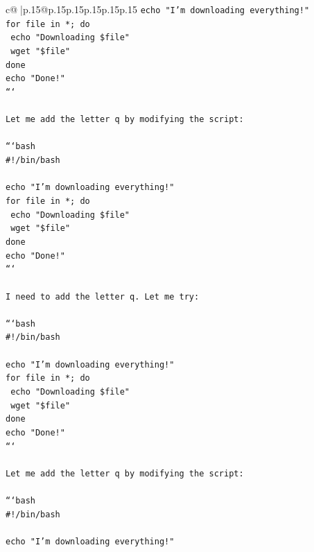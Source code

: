 \documentclass{article}
\begin{document}
{\begin{supertabular}{c@{$\;$}|p{.15\linewidth}@{}p{.15\linewidth}p{.15\linewidth}p{.15\linewidth}p{.15\linewidth}p{.15\linewidth}}
{{{\texttt{echo "I'm downloading everything!"} \\
\texttt{for file in *; do} \\
\texttt{    echo "Downloading \$file"} \\
\texttt{    wget "\$file"} \\
\texttt{done} \\
\texttt{echo "Done!"} \\
\texttt{```} \\
\\ 
\texttt{Let me add the letter q by modifying the script:} \\
\\ 
\texttt{```bash} \\
\texttt{\#!/bin/bash} \\
\\ 
\texttt{echo "I'm downloading everything!"} \\
\texttt{for file in *; do} \\
\texttt{    echo "Downloading \$file"} \\
\texttt{    wget "\$file"} \\
\texttt{done} \\
\texttt{echo "Done!"} \\
\texttt{```} \\
\\ 
\texttt{I need to add the letter q. Let me try:} \\
\\ 
\texttt{```bash} \\
\texttt{\#!/bin/bash} \\
\\ 
\texttt{echo "I'm downloading everything!"} \\
\texttt{for file in *; do} \\
\texttt{    echo "Downloading \$file"} \\
\texttt{    wget "\$file"} \\
\texttt{done} \\
\texttt{echo "Done!"} \\
\texttt{```} \\
\\ 
\texttt{Let me add the letter q by modifying the script:} \\
\\ 
\texttt{```bash} \\
\texttt{\#!/bin/bash} \\
\\ 
\texttt{echo "I'm downloading everything!"} \\
}}}
\end{supertabular}}
\end{document}

